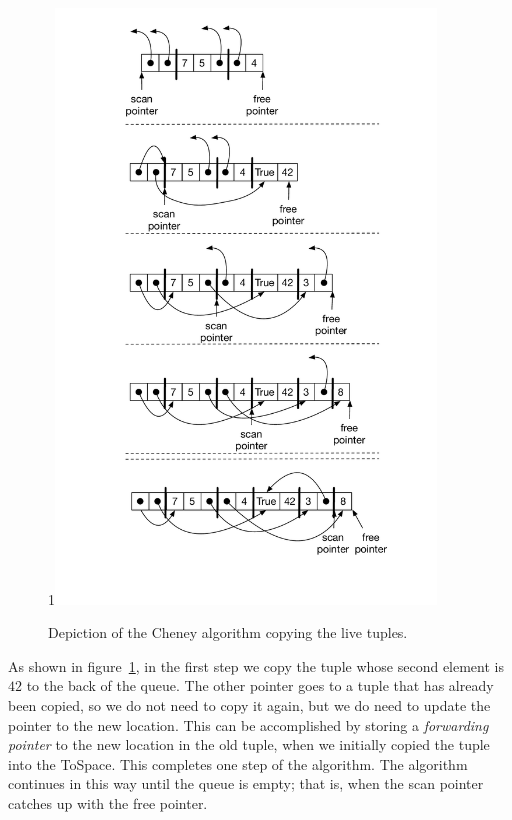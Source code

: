 \documentclass[7x10]{TimesAPriori_MIT}%
\def\pythonEd{1}
\def\edition{1}
\newcommand{\pythonColor}[0]{}
\newcommand{\python}[1]{{\if\edition\pythonEd\pythonColor #1\fi}}
\numberwithin{theorem}{chapter}
\numberwithin{definition}{chapter}
\numberwithin{equation}{chapter}
\begin{document}
\begin{figure}[tbp]
\begin{tcolorbox}[colback=white]
\python{\includegraphics[width=0.9\textwidth]{figs/cheney-python}}
\end{tcolorbox}

\caption{Depiction of the Cheney algorithm copying the live tuples.}
\label{fig:cheney}
\end{figure}

As shown in figure~\ref{fig:cheney}, in the first step we copy the
tuple whose second element is $42$ to the back of the queue. The other
pointer goes to a tuple that has already been copied, so we do not
need to copy it again, but we do need to update the pointer to the new
location. This can be accomplished by storing a \emph{forwarding
pointer} to the new location in the
old tuple, when we initially copied the tuple into the
ToSpace. This completes one step of the algorithm. The algorithm
continues in this way until the queue is empty; that is, when the scan
pointer catches up with the free pointer.
\end{document}
